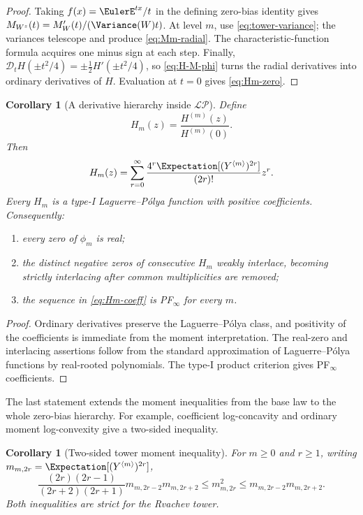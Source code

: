 \documentclass[11pt,oneside]{article}
\newtheorem{corollary}[theorem]{Corollary}
\theoremstyle{definition}
\theoremstyle{remark}
\newcommand{\LP}{\mathcal{LP}}
\newcommand{\Dop}{\mathscr D}
\newcommand{\Tower}[1]{Y^{\langle #1\rangle}}
\begin{document}
\begin{proof}
Taking $f(x)=\EulerE^{tx}/t$ in the defining zero-bias identity gives
$M_{W^z}(t)=M_W'(t)/(\Variance(W)t)$.  At level $m$, use
\eqref{eq:tower-variance}; the variances telescope and produce
\eqref{eq:Mm-radial}.  The characteristic-function formula acquires one minus
sign at each step.  Finally,
\(
 \Dop_t H(\pm t^2/4)=\pm\frac12H'(\pm t^2/4)
\), so \eqref{eq:H-M-phi} turns the radial derivatives into ordinary
derivatives of $H$.  Evaluation at $t=0$ gives \eqref{eq:Hm-zero}.
\end{proof}

\begin{corollary}[A derivative hierarchy inside $\LP$]
\label{cor:LP-hierarchy}
Define
\begin{equation}
 H_m(z)=\frac{H^{(m)}(z)}{H^{(m)}(0)}.
\end{equation}
Then
\begin{equation}
 H_m(z)=\sum_{r=0}^{\infty}
        \frac{4^r\Expectation[(\Tower{m})^{2r}]}{(2r)!}z^r.    \label{eq:Hm-coeff}
\end{equation}
Every $H_m$ is a type-I Laguerre--P\'olya function with positive coefficients.
Consequently:
\begin{enumerate}
\item every zero of $\phi_m$ is real;
\item the distinct negative zeros of consecutive $H_m$ weakly interlace,
      becoming strictly interlacing after common multiplicities are removed;
\item the sequence in \eqref{eq:Hm-coeff} is PF$_\infty$ for every $m$.
\end{enumerate}
\end{corollary}

\begin{proof}
Ordinary derivatives preserve the Laguerre--P\'olya class, and positivity of
the coefficients is immediate from the moment interpretation.  The real-zero
and interlacing assertions follow from the standard approximation of
Laguerre--P\'olya functions by real-rooted polynomials.  The type-I product
criterion gives PF$_\infty$ coefficients.
\end{proof}

The last statement extends the moment inequalities from the base law to the
whole zero-bias hierarchy.  For example, coefficient log-concavity and ordinary
moment log-convexity give a two-sided inequality.

\begin{corollary}[Two-sided tower moment inequality]
For $m\ge0$ and $r\ge1$, writing
$m_{m,2r}=\Expectation[(\Tower{m})^{2r}]$,
\begin{equation}
 \frac{(2r)(2r-1)}{(2r+2)(2r+1)}
 m_{m,2r-2}m_{m,2r+2}
 \le m_{m,2r}^2
 \le m_{m,2r-2}m_{m,2r+2}.                         \label{eq:tower-Turan}
\end{equation}
Both inequalities are strict for the Rvachev tower.
\end{corollary}
\end{document}
